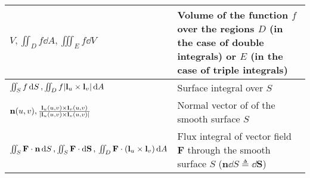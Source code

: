 \begin{xltabular}{\textwidth}{XX}
	\(V, \iint_D f \dd{A}, \iiint_E f \dd{V}\)                                                                                                                                                                                                                                                         & Volume of the function \(f\) over the regions \(D\) (in the case of double integrals) or \(E\) (in the case of triple integrals)                                                                                                                                                                                                    \\ \hline
	\(\iint_S f \dd{S}, \iint_D f \abs{\mathbf{l}_u\times\mathbf{l}_v} \dd{A}\)                                                                                                                                                                                                                        & Surface integral over \(S\)                                                                                                                                                                                                                                                                                                         \\ \hline
	\(\mathbf{n}(u,v), \frac{\mathbf{l}_u(u,v)\times\mathbf{l}_v(u,v)}{\abs{\mathbf{l}_u(u,v)\times\mathbf{l}_v(u,v)}}\)                                                                                                                                                                               & Normal vector of of the smooth surface \(S\)                                                                                                                                                                                                                                                                                        \\ \hline
	\(\iint_S \mathbf{F}\cdot \mathbf{n} \dd{S}, \iint_S \mathbf{F} \cdot \dd{\mathbf{S}}, \newline \iint_D \mathbf{F} \cdot (\mathbf{l}_u\times\mathbf{l}_v) \dd{A}\)                                                                                                                                 & Flux integral of vector field \(\mathbf{F}\) through the smooth surface \(S\) (\(\mathbf{n} \dd{S} \triangleq \dd{\mathbf{S}}\))                                                                                                                                                                                                    \\ \hline

\end{xltabular}
